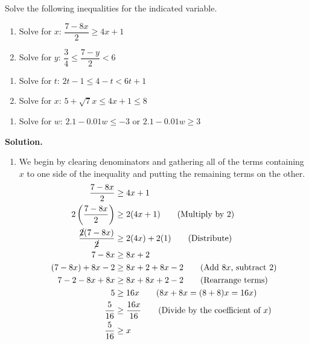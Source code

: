 \begin{ex}\label{linearineqreview}  Solve the following inequalities for the indicated variable. 

\begin{enumerate}

\item  Solve for $x$: $\dfrac{7-8x}{2} \geq 4x + 1$

\item  Solve for $y$: $\dfrac{3}{4} \leq \dfrac{7-y}{2} < 6$

\setcounter{HW}{\value{enumi}}

\end{enumerate}

\begin{enumerate}

\setcounter{enumi}{\value{HW}}

\item  Solve for $t$:  $2t-1 \leq 4-t < 6t+1$

\item  Solve for $x$: $5 + \sqrt{7} x \leq 4x + 1 \leq 8$


\setcounter{HW}{\value{enumi}}

\end{enumerate}

\begin{enumerate}
\setcounter{enumi}{\value{HW}}

\item  Solve for $w$: $2.1 - 0.01w \leq -3$ or $2.1-0.01w \geq 3$


\end{enumerate}

{\bf Solution.}

\begin{enumerate}

\item  We begin by clearing denominators and gathering all of the terms containing $x$ to one side of the inequality and putting the remaining terms on the other.
\begin{align*}
\dfrac{7-8x}{2} & \geq 4x + 1 \\
2\left(\dfrac{7-8x}{2}\right) & \geq 2(4x + 1) \tag{Multiply by $2$} \\
\dfrac{\cancel{2}(7-8x)}{\cancel{2}} & \geq 2(4x) + 2(1) \tag{Distribute} \\
7 - 8x & \geq 8x + 2 \\
(7-8x) + 8x-2 & \geq 8x+2 + 8x -2 \tag{Add $8x$, subtract $2$} \\
7 - 2 - 8x + 8x & \geq 8x + 8x + 2 - 2 \tag{Rearrange terms} \\
5 & \geq 16x \tag{$8x + 8x = (8+8)x = 16x$} \\
\dfrac{5}{16} & \geq \dfrac{16x}{16} \tag{Divide by the coefficient of $x$} \\
\dfrac{5}{16} & \geq x \\ 
\end{align*}


\end{enumerate}
\end{ex}
